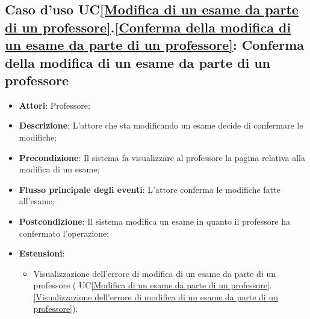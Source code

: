 \subsection{Caso d'uso UC\ref{Modifica di un esame da parte di un professore}.\ref{Conferma della modifica di un esame da parte di un professore}: Conferma della modifica di un esame da parte di un professore}
\begin{itemize}
	\item \textbf{Attori}: Professore;
	\item \textbf{Descrizione}: L'attore che sta modificando un esame decide di confermare le modifiche;
	\item \textbf{Precondizione}: Il sistema fa visualizzare al professore la pagina relativa alla modifica di un esame;
	
	\item \textbf{Flusso principale degli eventi}: L'attore conferma le modifiche fatte all'esame;
	\item \textbf{Postcondizione}: Il sistema modifica un esame in quanto il professore ha confermato l'operazione;
	
	\item \textbf{Estensioni}:
	\begin{itemize}
		\item Visualizzazione dell'errore di modifica di un esame da parte di un professore ( UC\ref{Modifica di un esame da parte di un professore}.\ref{Visualizzazione dell'errore di modifica di un esame da parte di un professore}).
	\end{itemize}
\end{itemize}


